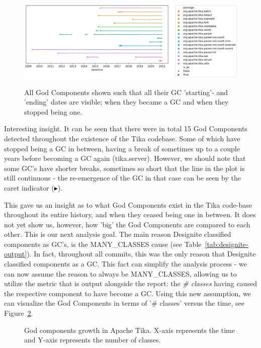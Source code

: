 \documentclass{article}
\begin{document}
\begin{figure}[ht]
    \centering
    \includegraphics[width=\textwidth]{report/images/gc_lineplot.png}
    \label{fig:gc_lineplot}
    \caption{All God Components shown such that all their GC 'starting'- and 'ending' dates are visible; when they became a GC and when they stopped being one.}
\end{figure}

Interesting insight. It can be seen that there were in total 15 God Components detected throughout the existence of the Tika codebase. Some of which have stopped being a GC in between, having a break of sometimes up to a couple years before becoming a GC again (tika.server). However, we should note that some GC's have shorter breaks, sometimes so short that the line in the plot is still continuous - the re-emergence of the GC in that case can be seen by the caret indicator ($\blacktriangleright$).

This gave us an insight as to what God Components exist in the Tika code-base throughout its entire history, and when they ceased being one in between. It does not yet show us, however, how 'big' the God Components are compared to each other. This is our next analysis goal. The main reason Designite classified components as GC's, is the MANY\_CLASSES cause (see Table~\ref{tab:designite-output}). In fact, throughout all commits, this was the only reason that Designite classified components as a GC. This fact can simplify the analysis process - we can now assume the reason to always be MANY\_CLASSES, allowing us to utilize the metric that is output alongside the report: the \textit{\# classes} having caused the respective component to have become a GC. Using this new assumption, we can visualize the God Components in terms of '\# classes' versus the time, see Figure~\ref{fig:class_growth}.

\begin{figure}[ht]
    \centering
    
    \label{fig:class_growth}
    \caption{God components growth in Apache Tika. X-axis represents the time and Y-axis represents the number of classes.}
\end{figure}
\end{document}
